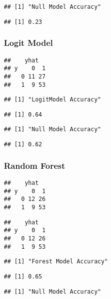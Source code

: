 \documentclass[
]{article}
\begin{document}
\begin{verbatim}
## [1] "Null Model Accuracy"
\end{verbatim}

\begin{verbatim}
## [1] 0.23
\end{verbatim}

\hypertarget{logit-model}{%
\subsubsection{Logit Model}\label{logit-model}}

\begin{verbatim}
##    yhat
## y    0  1
##   0 11 27
##   1  9 53
\end{verbatim}

\begin{verbatim}
## [1] "LogitModel Accuracy"
\end{verbatim}

\begin{verbatim}
## [1] 0.64
\end{verbatim}

\begin{verbatim}
## [1] "Null Model Accuracy"
\end{verbatim}

\begin{verbatim}
## [1] 0.62
\end{verbatim}

\hypertarget{random-forest}{%
\subsubsection{Random Forest}\label{random-forest}}

\begin{verbatim}
##    yhat
## y    0  1
##   0 12 26
##   1  9 53
\end{verbatim}

\begin{verbatim}
##    yhat
## y    0  1
##   0 12 26
##   1  9 53
\end{verbatim}

\begin{verbatim}
## [1] "Forest Model Accuracy"
\end{verbatim}

\begin{verbatim}
## [1] 0.65
\end{verbatim}

\begin{verbatim}
## [1] "Null Model Accuracy"
\end{verbatim}
\end{document}
